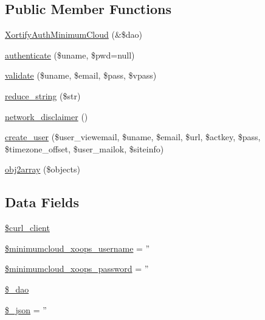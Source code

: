 \subsection*{Public Member Functions}
\begin{DoxyCompactItemize}
\item 
\hyperlink{class_xortify_auth_minimum_cloud_ab5abc9d5e7788b74fe7dcd8a3dd7e315}{Xortify\-Auth\-Minimum\-Cloud} (\&\$dao)
\item 
\hyperlink{class_xortify_auth_minimum_cloud_a00678ba307326b734e6c679f28bea315}{authenticate} (\$uname, \$pwd=null)
\item 
\hyperlink{class_xortify_auth_minimum_cloud_a91121a1b702dfd20fb65a027c8ed26ec}{validate} (\$uname, \$email, \$pass, \$vpass)
\item 
\hyperlink{class_xortify_auth_minimum_cloud_ae463a3baa44e95fa5b5151ab2334df1c}{reduce\-\_\-string} (\$str)
\item 
\hyperlink{class_xortify_auth_minimum_cloud_a1874c27b6f81a3f2ff9015405ad0f8bc}{network\-\_\-disclaimer} ()
\item 
\hyperlink{class_xortify_auth_minimum_cloud_ac72efc5ad313a592cf6706876f56f7ec}{create\-\_\-user} (\$user\-\_\-viewemail, \$uname, \$email, \$url, \$actkey, \$pass, \$timezone\-\_\-offset, \$user\-\_\-mailok, \$siteinfo)
\item 
\hyperlink{class_xortify_auth_minimum_cloud_aabc52e4f78557f0e0b360a8aaba6e11d}{obj2array} (\$objects)
\end{DoxyCompactItemize}
\subsection*{Data Fields}
\begin{DoxyCompactItemize}
\item 
\hyperlink{class_xortify_auth_minimum_cloud_a402f2112991f3227835af80e9df33e38}{\$curl\-\_\-client}
\item 
\hyperlink{class_xortify_auth_minimum_cloud_a43e053bc7e50dc0203616ef89c3fb392}{\$minimumcloud\-\_\-xoops\-\_\-username} = ''
\item 
\hyperlink{class_xortify_auth_minimum_cloud_a8dfe74264e11f530e89e3527d432b4c1}{\$minimumcloud\-\_\-xoops\-\_\-password} = ''
\item 
\hyperlink{class_xortify_auth_minimum_cloud_a12a029c610f699b4b25e79a1f64a3485}{\$\-\_\-dao}
\item 
\hyperlink{class_xortify_auth_minimum_cloud_a94787b37d92a2dee02534eed4f316589}{\$\-\_\-json} = ''
\end{DoxyCompactItemize}


